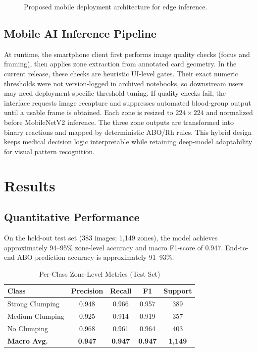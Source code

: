 \documentclass[conference]{IEEEtran}
\begin{document}
\begin{figure}[htbp]
  \centering
  \caption{Proposed mobile deployment architecture for edge inference.}
  \label{fig:mobile_arch}
\end{figure}

\subsection{Mobile AI Inference Pipeline}
At runtime, the smartphone client first performs image quality checks (focus and framing), then applies zone extraction from annotated card geometry. In the current release, these checks are heuristic UI-level gates. Their exact numeric thresholds were not version-logged in archived notebooks, so downstream users may need deployment-specific threshold tuning. If quality checks fail, the interface requests image recapture and suppresses automated blood-group output until a usable frame is obtained. Each zone is resized to $224\times224$ and normalized before MobileNetV2 inference. The three zone outputs are transformed into binary reactions and mapped by deterministic ABO/Rh rules. This hybrid design keeps medical decision logic interpretable while retaining deep-model adaptability for visual pattern recognition.

\section{Results}
\subsection{Quantitative Performance}
On the held-out test set (383 images; 1,149 zones), the model achieves approximately 94--95\% zone-level accuracy and macro F1-score of 0.947. End-to-end ABO prediction accuracy is approximately 91--93\%.

\begin{table}[htbp]
  \caption{Per-Class Zone-Level Metrics (Test Set)}
  \label{tab:perclass}
  \centering
  \begin{tabular}{lcccc}
    \toprule
    \textbf{Class} & \textbf{Precision} & \textbf{Recall} & \textbf{F1} & \textbf{Support} \\
    \midrule
    Strong Clumping & 0.948 & 0.966 & 0.957 & 389 \\
    Medium Clumping & 0.925 & 0.914 & 0.919 & 357 \\
    No Clumping & 0.968 & 0.961 & 0.964 & 403 \\
    \midrule
    \textbf{Macro Avg.} & \textbf{0.947} & \textbf{0.947} & \textbf{0.947} & \textbf{1,149} \\
    \bottomrule
  \end{tabular}
\end{table}
\end{document}
